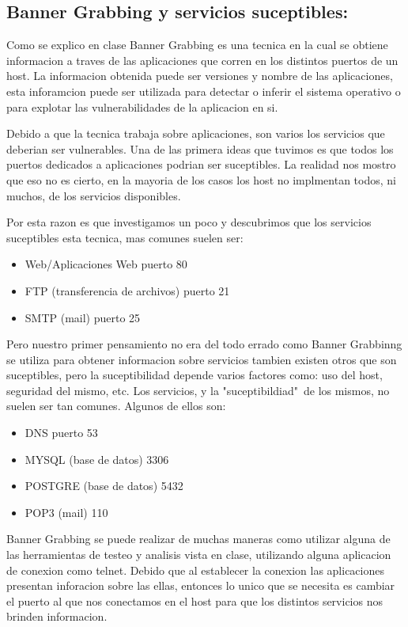 \documentclass[a4paper]{article}
\begin{document}
\subsection{Banner Grabbing y servicios suceptibles:}
Como se explico en clase  Banner Grabbing es una tecnica en la cual se obtiene informacion a traves de las aplicaciones que corren en los distintos puertos de un host. La informacion obtenida puede ser
versiones y nombre de las aplicaciones, esta inforamcion puede ser utilizada para detectar o inferir el sistema operativo o para explotar las vulnerabilidades de la aplicacion en si.

Debido a que la tecnica trabaja sobre aplicaciones, son varios los servicios que deberian ser vulnerables. Una de las primera ideas que tuvimos es que todos los puertos dedicados a aplicaciones
podrian ser suceptibles. La realidad nos mostro que eso no es cierto, en la mayoria de los casos los host no implmentan todos, ni muchos, de los servicios disponibles. 

Por esta razon es que investigamos un poco y descubrimos que  los servicios suceptibles esta tecnica, mas comunes suelen ser:
\begin{itemize}
\item Web/Aplicaciones Web puerto 80
\item FTP (transferencia de archivos) puerto 21
\item SMTP (mail) puerto 25
\end{itemize}


Pero nuestro primer pensamiento no era del todo errado como Banner Grabbinng se utiliza para obtener informacion sobre servicios tambien existen otros que son suceptibles, pero la suceptibilidad depende
varios factores como: uso del host, seguridad del mismo, etc. Los servicios, y la "suceptibildiad"\ de los mismos, no suelen ser tan comunes. Algunos de ellos son:

\begin{itemize}

\item DNS puerto 53
\item MYSQL (base de datos) 3306
\item POSTGRE (base de datos) 5432
\item POP3 (mail) 110

\end{itemize}


Banner Grabbing se puede realizar de muchas maneras como utilizar alguna de las herramientas de testeo y analisis vista en clase, utilizando alguna aplicacion de conexion como telnet. Debido que al 
establecer la conexion las aplicaciones presentan inforacion sobre las ellas, entonces lo unico que se necesita es cambiar el puerto al que nos conectamos en el host para que los distintos servicios nos
brinden informacion.
\end{document}
